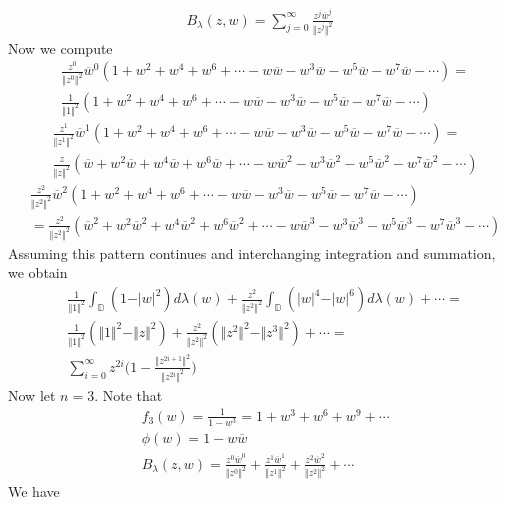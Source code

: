 \documentclass[12pt]{article}
\begin{document}
\begin{align}
B_\lambda(z,w) = \sum_{j=0}^\infty \frac{z^j \overline{w}^j}{\Vert z^j \Vert^2}
\end{align} Now we compute
\begin{align}
&\frac{z^0}{\Vert z^0 \Vert^2}\overline{w}^0(1 + w^2 + w^4  + w^6 + \cdots - w\overline{w} - w^3 \overline{w} - w^5 \overline{w} - w^7 \overline{w} - \cdots) = \\
& \frac{1}{\Vert 1 \Vert^2} (1 + w^2 + w^4 + w^6 + \cdots - w\overline{w} - w^3\overline{w} - w^5 \overline{w} - w^7 \overline{w} - \cdots)
\end{align}
\begin{align}
&\frac{z^1}{\Vert z^1 \Vert^2} \overline{w}^1 (1 + w^2 + w^4  + w^6 + \cdots - w\overline{w} - w^3 \overline{w} - w^5 \overline{w} - w^7 \overline{w} - \cdots) = \\ 
& \frac{z}{\Vert z \Vert^2} (\overline{w} + w^2 \overline{w} + w^4\overline{w} + w^6 \overline{w} + \cdots - w \overline{w}^2 - w^3 \overline{w}^2 - w^5 \overline{w}^2 - w^7 \overline{w}^2 - \cdots)
\end{align}
\begin{align}
&\frac{z^2}{\Vert z^2 \Vert^2} \overline{w}^2 (1 + w^2 + w^4 + w^6 + \cdots - w\overline{w} - w^3 \overline{w} - w^5 \overline{w} - w^7 \overline{w} - \cdots) \\
& = \frac{z^2}{\Vert z^2 \Vert^2}  (\overline{w}^2 + w^2\overline{w}^2 + w^4 \overline{w}^2 + w^6 \overline{w}^2 + \cdots - w \overline{w}^3 - w^3 \overline{w}^3 - w^5 \overline{w}^3 - w^7\overline{w}^3 - \cdots)
\end{align} Assuming this pattern continues and interchanging integration and summation, we obtain
\begin{align}
&\frac{1}{\Vert 1 \Vert^2} \int_\mathbb{D} (1 - \vert w \vert^2) d\lambda(w) + \frac{z^2}{\Vert z^2 \Vert^2} \int_\mathbb{D} (\vert w \vert^4 - \vert w \vert^6) d\lambda(w) + \cdots  = \\
& \frac{1}{\Vert 1 \Vert^2}(\Vert 1 \Vert^2 - \Vert z \Vert^2) + \frac{z^2}{\Vert z^2 \Vert^2}(\Vert z^2 \Vert^2 - \Vert z^3\Vert^2) + \cdots =\\
& \sum_{i=0}^\infty z^{2i} \bigg(1 - \frac{\Vert z^{2i+1}\Vert^2}{\Vert z^{2i}\Vert^2}\bigg)
\end{align} Now let $n = 3$. Note that
\begin{align}
&f_3(w) = \frac{1}{1-w^3} = 1 + w^3 + w^6 + w^9 + \cdots\\
&\phi(w) = 1 - w \overline{w}\\
&B_\lambda(z,w) = \frac{z^0 \overline{w}^0}{\Vert z^0 \Vert^2} + \frac{z^1 \overline{w}^1}{\Vert z^1 \Vert^2} + \frac{z^2 \overline{w}^2}{\Vert z^2 \Vert^2} + \cdots
\end{align} We have
\end{document}
